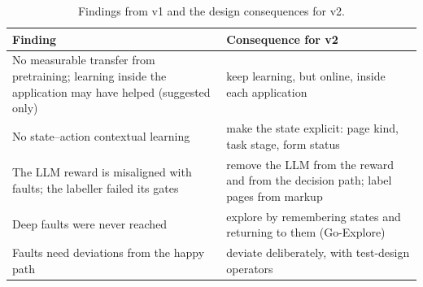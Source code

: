 \begin{table}[H]
\centering
\small
\caption{Findings from v1 and the design consequences for v2.}
\label{tab:lessons}
\begin{tabularx}{\textwidth}{@{}XX@{}}
\toprule
Finding & Consequence for v2 \\
\midrule
No measurable transfer from pretraining; learning inside the application may have helped (suggested only) & keep learning, but online, inside each application \\
No state--action contextual learning & make the state explicit: page kind, task stage, form status \\
The LLM reward is misaligned with faults; the labeller failed its gates & remove the LLM from the reward and from the decision path; label pages from markup \\
Deep faults were never reached & explore by remembering states and returning to them (Go-Explore) \\
Faults need deviations from the happy path & deviate deliberately, with test-design operators \\
\bottomrule
\end{tabularx}
\end{table}
